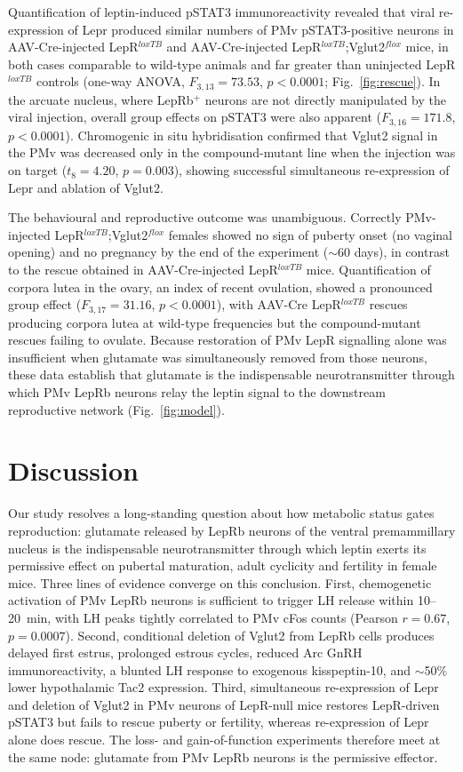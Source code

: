 \documentclass[11pt]{article}
\begin{document}
Quantification of leptin-induced pSTAT3 immunoreactivity revealed that viral re-expression of Lepr produced similar numbers of PMv pSTAT3-positive neurons in AAV-Cre-injected LepR$^{loxTB}$ and AAV-Cre-injected LepR$^{loxTB}$;Vglut2$^{flox}$ mice, in both cases comparable to wild-type animals and far greater than uninjected LepR$^{loxTB}$ controls (one-way ANOVA, $F_{3,13}=73.53$, $p<0.0001$; Fig.~\ref{fig:rescue}). In the arcuate nucleus, where LepRb$^+$ neurons are not directly manipulated by the viral injection, overall group effects on pSTAT3 were also apparent ($F_{3,16}=171.8$, $p<0.0001$). Chromogenic in situ hybridisation confirmed that Vglut2 signal in the PMv was decreased only in the compound-mutant line when the injection was on target ($t_{8}=4.20$, $p=0.003$), showing successful simultaneous re-expression of Lepr and ablation of Vglut2.

The behavioural and reproductive outcome was unambiguous. Correctly PMv-injected LepR$^{loxTB}$;Vglut2$^{flox}$ females showed no sign of puberty onset (no vaginal opening) and no pregnancy by the end of the experiment ($\sim$60 days), in contrast to the rescue obtained in AAV-Cre-injected LepR$^{loxTB}$ mice. Quantification of corpora lutea in the ovary, an index of recent ovulation, showed a pronounced group effect ($F_{3,17}=31.16$, $p<0.0001$), with AAV-Cre LepR$^{loxTB}$ rescues producing corpora lutea at wild-type frequencies but the compound-mutant rescues failing to ovulate. Because restoration of PMv LepR signalling alone was insufficient when glutamate was simultaneously removed from those neurons, these data establish that glutamate is the indispensable neurotransmitter through which PMv LepRb neurons relay the leptin signal to the downstream reproductive network (Fig.~\ref{fig:model}).

\section{Discussion}

Our study resolves a long-standing question about how metabolic status gates reproduction: glutamate released by LepRb neurons of the ventral premammillary nucleus is the indispensable neurotransmitter through which leptin exerts its permissive effect on pubertal maturation, adult cyclicity and fertility in female mice. Three lines of evidence converge on this conclusion. First, chemogenetic activation of PMv LepRb neurons is sufficient to trigger LH release within 10--20~min, with LH peaks tightly correlated to PMv cFos counts (Pearson $r=0.67$, $p=0.0007$). Second, conditional deletion of Vglut2 from LepRb cells produces delayed first estrus, prolonged estrous cycles, reduced Arc GnRH immunoreactivity, a blunted LH response to exogenous kisspeptin-10, and $\sim$50\% lower hypothalamic Tac2 expression. Third, simultaneous re-expression of Lepr and deletion of Vglut2 in PMv neurons of LepR-null mice restores LepR-driven pSTAT3 but fails to rescue puberty or fertility, whereas re-expression of Lepr alone does rescue. The loss- and gain-of-function experiments therefore meet at the same node: glutamate from PMv LepRb neurons is the permissive effector.
\end{document}
